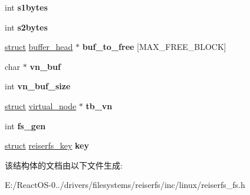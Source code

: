 \begin{DoxyCompactItemize}
int {\bfseries s1bytes}
\item 
\mbox{\label{structtree__balance_a36e198d1a70d8d2d14812faed19670e5}} 
int {\bfseries s2bytes}
\item 
\mbox{\label{structtree__balance_a71571c07618c708245e2f0b6eed1ea59}} 
\hyperlink{interfacestruct}{struct} \hyperlink{structbuffer__head}{buffer\+\_\+head} $\ast$ {\bfseries buf\+\_\+to\+\_\+free} \mbox{[}M\+A\+X\+\_\+\+F\+R\+E\+E\+\_\+\+B\+L\+O\+CK\mbox{]}
\item 
\mbox{\label{structtree__balance_aade8ecab1fe07e2f5589b6514258cabe}} 
char $\ast$ {\bfseries vn\+\_\+buf}
\item 
\mbox{\label{structtree__balance_a628f5576310a644cc3ce45ef81b147fe}} 
int {\bfseries vn\+\_\+buf\+\_\+size}
\item 
\mbox{\label{structtree__balance_aa3cbe30ccbcc9422bbc83828ac9f95b3}} 
\hyperlink{interfacestruct}{struct} \hyperlink{structvirtual__node}{virtual\+\_\+node} $\ast$ {\bfseries tb\+\_\+vn}
\item 
\mbox{\label{structtree__balance_ab3917b9da600a824de3ffd13beb266a9}} 
int {\bfseries fs\+\_\+gen}
\item 
\mbox{\label{structtree__balance_aea904f876e0dbb788d79d802a7c9b705}} 
\hyperlink{interfacestruct}{struct} \hyperlink{structreiserfs__key}{reiserfs\+\_\+key} {\bfseries key}
\end{DoxyCompactItemize}


该结构体的文档由以下文件生成\+:\begin{DoxyCompactItemize}
\item 
E\+:/\+React\+O\+S-\/0../drivers/filesystems/reiserfs/inc/linux/reiserfs\+\_\+fs.\+h\end{DoxyCompactItemize}
